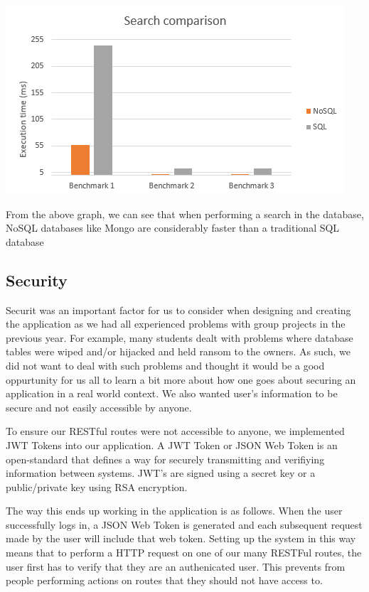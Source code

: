     \begin{center}    
      \includegraphics{img/SQLvsNOSQL.png}
    \end{center}

    From the above graph, we can see that when performing a search in the database, NoSQL databases like Mongo are considerably faster than a traditional SQL database \cite{SQLvsNOSQL}

    \subsection{Security}
    Securit was an important factor for us to consider when designing and creating the application as we had all experienced problems with group projects in the previous year. For example, many students dealt with problems where database tables were wiped and/or hijacked and held ransom
    to the owners. As such, we did not want to deal with such problems and thought it would be a good oppurtunity for us all to learn a bit more about how one goes about securing an application in a real world context. We also wanted user's information to be secure and not easily accessible by anyone.
    
    To ensure our RESTful routes were not accessible to anyone, we implemented JWT Tokens into our application. A JWT Token or JSON Web Token is an open-standard that defines a way for securely transmitting and verifiying information between systems.
    JWT's are signed using a secret key or a public/private key using RSA encryption.
    
    The way this ends up working in the application is as follows. When the user successfully logs in, a JSON Web Token is generated and each subsequent request
    made by the user will include that web token. Setting up the system in this way means that to perform a HTTP request on one of our many RESTFul routes, the user first has to 
    verify that they are an authenicated user. This prevents from people performing actions on routes that they should not have access to. 

